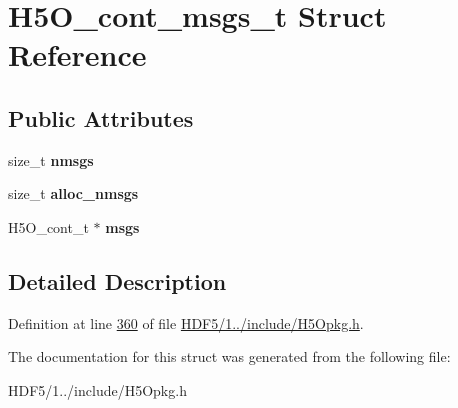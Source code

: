 \hypertarget{struct_h5_o__cont__msgs__t}{}\section{H5\+O\+\_\+cont\+\_\+msgs\+\_\+t Struct Reference}
\label{struct_h5_o__cont__msgs__t}
\subsection*{Public Attributes}
\begin{DoxyCompactItemize}
\item 
\mbox{\label{struct_h5_o__cont__msgs__t_adf35d95303d6d27fcd494047215db8cf}} 
size\+\_\+t {\bfseries nmsgs}
\item 
\mbox{\label{struct_h5_o__cont__msgs__t_ace7db03ad1b0774f93a477fe85d57dac}} 
size\+\_\+t {\bfseries alloc\+\_\+nmsgs}
\item 
\mbox{\label{struct_h5_o__cont__msgs__t_a2a703ffc0b773bd02ede51bd34feb1bb}} 
H5\+O\+\_\+cont\+\_\+t $\ast$ {\bfseries msgs}
\end{DoxyCompactItemize}


\subsection{Detailed Description}


Definition at line \hyperlink{_h_d_f5_21_810_81_2include_2_h5_opkg_8h_source_l00360}{360} of file \hyperlink{_h_d_f5_21_810_81_2include_2_h5_opkg_8h_source}{H\+D\+F5/1../include/\+H5\+Opkg.\+h}.



The documentation for this struct was generated from the following file\+:\begin{DoxyCompactItemize}
\item 
H\+D\+F5/1../include/\+H5\+Opkg.\+h\end{DoxyCompactItemize}
